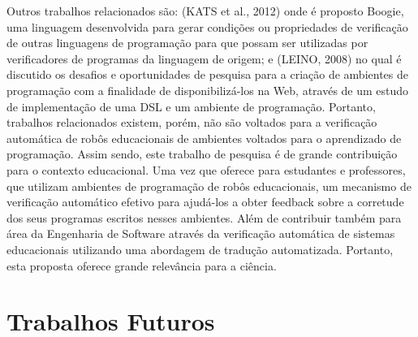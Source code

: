 Outros trabalhos relacionados são: (KATS et al., 2012) onde é proposto Boogie, uma linguagem desenvolvida para gerar condições ou propriedades de verificação de outras linguagens de programação para que possam ser utilizadas por verificadores de programas da linguagem de origem; e (LEINO, 2008) no qual é discutido os desafios e oportunidades de pesquisa para a criação de ambientes de programação com a finalidade de disponibilizá-los na Web, através de um estudo de implementação de uma DSL e um ambiente de programação. Portanto, trabalhos relacionados existem, porém, não são voltados para a verificação automática de robôs educacionais de ambientes voltados para o aprendizado de programação.
Assim sendo, este trabalho de pesquisa é de grande contribuição para o contexto educacional. Uma vez que oferece para estudantes e professores, que utilizam ambientes de programação de robôs educacionais, um mecanismo de verificação automático efetivo para ajudá-los a obter feedback sobre a corretude dos seus programas escritos nesses ambientes. Além de contribuir também para área da Engenharia de Software através da verificação automática de sistemas educacionais utilizando uma abordagem de tradução automatizada. Portanto, esta proposta oferece grande relevância para a ciência.


\section{Trabalhos Futuros}